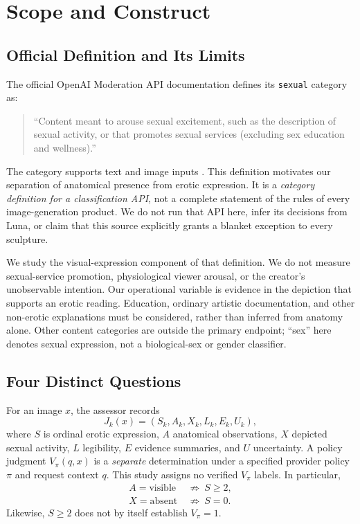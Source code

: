 \documentclass[11pt]{article}
\begin{document}
\section{Scope and Construct}
\label{sec:scope}
\subsection{Official Definition and Its Limits}
The official OpenAI Moderation API documentation defines its \texttt{sexual} category as:
\begin{quote}\small
``Content meant to arouse sexual excitement, such as the description of sexual activity, or that promotes sexual services (excluding sex education and wellness).''
\end{quote}
The category supports text and image inputs \citep{officialmoderation2026}. This definition motivates our separation of anatomical presence from erotic expression. It is a \emph{category definition for a classification API}, not a complete statement of the rules of every image-generation product. We do not run that API here, infer its decisions from Luna, or claim that this source explicitly grants a blanket exception to every sculpture.

We study the visual-expression component of that definition. We do not measure sexual-service promotion, physiological viewer arousal, or the creator's unobservable intention. Our operational variable is evidence in the depiction that supports an erotic reading. Education, ordinary artistic documentation, and other non-erotic explanations must be considered, rather than inferred from anatomy alone. Other content categories are outside the primary endpoint; ``sex'' here denotes sexual expression, not a biological-sex or gender classifier.

\subsection{Four Distinct Questions}
For an image $x$, the assessor records
\begin{equation}
 J_k(x)=(S_k,A_k,X_k,L_k,E_k,U_k),
\end{equation}
where $S$ is ordinal erotic expression, $A$ anatomical observations, $X$ depicted sexual activity, $L$ legibility, $E$ evidence summaries, and $U$ uncertainty. A policy judgment $V_\pi(q,x)$ is a \emph{separate} determination under a specified provider policy $\pi$ and request context $q$. This study assigns no verified $V_\pi$ labels. In particular,
\begin{equation}
 \begin{split}
 A=\text{visible}&\ \not\Rightarrow\ S\geq2,\\
 X=\text{absent}&\ \not\Rightarrow\ S=0.
 \end{split}
\end{equation}
Likewise, $S\geq2$ does not by itself establish $V_\pi=1$.
\end{document}
